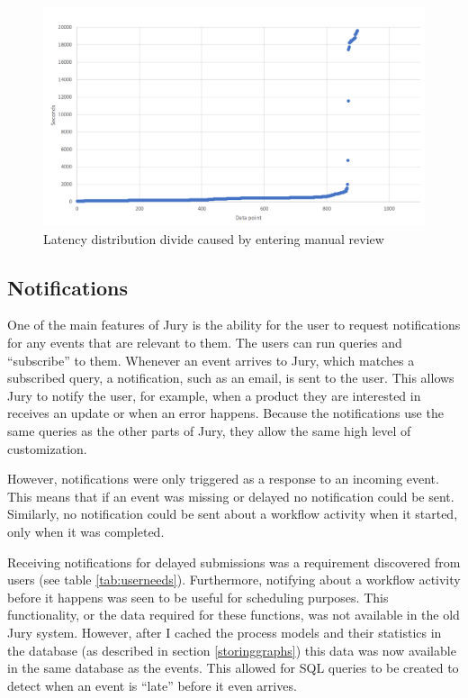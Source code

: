 \begin{figure}[p]
    \centering \includegraphics[width=0.9\linewidth]{gfx/graphs/manualreview.png}
    \caption{Latency distribution divide caused by entering manual review}
    \label{fig:manualreview}
\end{figure}

\subsection{Notifications}
\label{sec:notifications}

One of the main features of Jury is the ability for the user to request notifications for any events that are relevant to them.
The users can run queries and ``subscribe'' to them.
Whenever an event arrives to Jury, which matches a subscribed query, a notification, such as an email, is sent to the user.
This allows Jury to notify the user, for example, when a product they are interested in receives an update or when an error happens.
Because the notifications use the same queries as the other parts of Jury, they allow the same high level of customization.

However, notifications were only triggered as a response to an incoming event.
This means that if an event was missing or delayed no notification could be sent.
Similarly, no notification could be sent about a workflow activity when it started, only when it was completed.

Receiving notifications for delayed submissions was a requirement discovered from users (see table \ref{tab:userneeds}).
Furthermore, notifying about a workflow activity before it happens was seen to be useful for scheduling purposes.
This functionality, or the data required for these functions, was not available in the old Jury system.
However, after I cached the process models and their statistics in the database (as described in section \ref{storinggraphs}) this data was now available in the same database as the events.
This allowed for SQL queries to be created to detect when an event is ``late'' before it even arrives.

